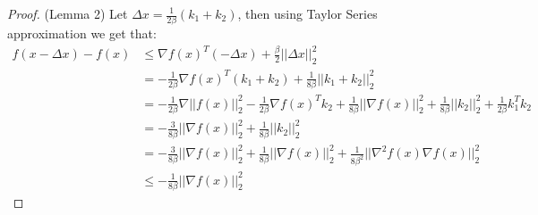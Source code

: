 \begin{proof}(Lemma 2)
Let $\Delta x = \frac{1}{2\beta}(k_1 + k_2) $, then using Taylor Series approximation we get that:
\begin{equation}
\begin{aligned}
f(x - \Delta x) - f(x) &\leq \nabla f(x)^T ( - \Delta x) + \frac{\beta}{2}|| \Delta x||_2^2 \\
& = - \frac{1}{2\beta}\nabla f(x)^T (k_1 + k_2) + \frac{1}{8\beta}||k_1 + k_2 ||_2^2 \\
& = - \frac{1}{2\beta}\nabla ||f(x)||_2^2 - \frac{1}{2\beta}\nabla f(x)^T k_2 + \frac{1}{8\beta}||\nabla f(x)||_2^2 + \frac{1}{8\beta}||k_2||_2^2 + \frac{1}{2\beta}k_1^T k_2 \\
& = -\frac{3}{8\beta}||\nabla f(x)||_2^2 + \frac{1}{8\beta}||k_2||_2^2 \\
& = -\frac{3}{8\beta}||\nabla f(x)||_2^2 + \frac{1}{8\beta}||\nabla f(x)||_2^2 + \frac{1}{8\beta^2}||\nabla^2 f(x) \nabla f(x)||_2^2 \\
& \leq - \frac{1}{8\beta}|| \nabla f(x)||_2^2
\end{aligned}
\end{equation}
\end{proof}


